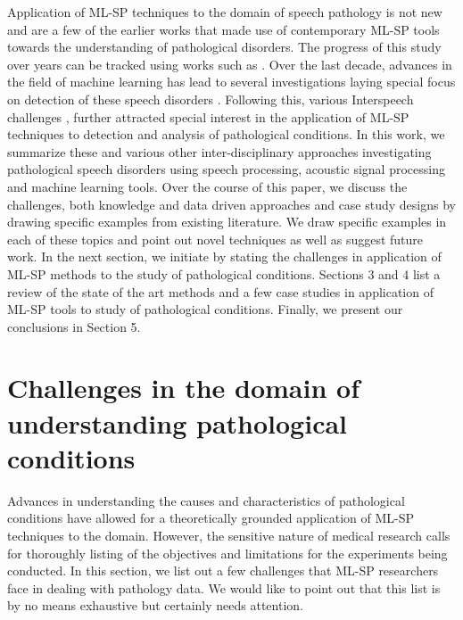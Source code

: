 \documentclass{article}
\begin{document}
Application of ML-SP techniques to the domain of speech pathology is not new and \cite{rees1973auditory,davis1979acoustic,robin1989auditory} are a few of the earlier works that made use of contemporary ML-SP tools towards the understanding of pathological disorders. 
The progress of this study over years can be tracked using works such as \cite{hillenbrand1994acoustic,abberton1989laryngographic,manfredi2000adaptive}.
Over the last decade, advances in the field of machine learning has lead to several investigations laying special focus on detection of these speech disorders \cite{fonseca2007wavelet,chee2009mfcc}. Following this, various Interspeech challenges \cite{schuller2012interspeech,}, further attracted special interest in the application of ML-SP techniques to detection and analysis of pathological conditions.  
In this work, we summarize these and various other inter-disciplinary approaches investigating pathological speech disorders using speech processing, acoustic signal processing and machine learning tools.
Over the course of this paper, we discuss the challenges, both knowledge and data driven approaches and case study designs by drawing specific examples from existing literature. 
We draw specific examples in each of these topics and point out novel techniques as well as suggest future work.
In the next section, we initiate by stating the challenges in application of ML-SP methods to the study of pathological conditions.
Sections 3 and 4 list a review of the state of the art methods and a few case studies in application of ML-SP tools to study of pathological conditions.
Finally, we present our conclusions in Section 5. 

\section{Challenges in the domain of understanding pathological conditions}
Advances in understanding the causes and characteristics of pathological conditions have allowed for a theoretically grounded application of ML-SP techniques to the domain.
However, the sensitive nature of medical research calls for thoroughly listing of the objectives and limitations for the experiments being conducted.
In this section, we list out a few challenges that ML-SP researchers face in dealing with pathology data.
We would like to point out that this list is by no means exhaustive but certainly needs attention.
\end{document}
